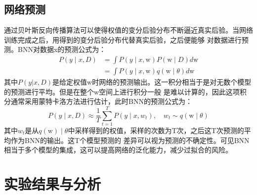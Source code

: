 \subsection{网络预测}
通过贝叶斯反向传播算法可以使得权值的变分后验分布不断逼近真实后验。当网络训练完成之后，用得到的变分后验分布代替真实后验，之后便能够
对数据进行预测。BNN对数据x的预测公式为：
\begin{equation}
	\label{}
	\begin{aligned}
	P(y \mid x, D) & =\int P(y \mid x, \mathrm{w}) P(\mathrm{w} \mid D) d \mathrm{w} \\
	& =\int P(y \mid x, \mathrm{w}) q(\mathrm{w} \mid \theta) d \mathrm{w}
	\end{aligned}
\end{equation}
其中$P(y|x,D)$是给定权值w时网络的预测输出。这一积分相当于是对无数个模型的预测进行平均。但是在整个w空间上进行积分一般
是难以计算的，因此这项积分通常采用蒙特卡洛方法进行估计，此时BNN的预测公式为：
\begin{equation}
	\label{}
	P(y \mid x, D) \approx \frac{1}{T} \sum_{t=1}^T P\left(y \mid x, w_t\right), \quad w_t \sim q(\mathrm{w} \mid \theta)
\end{equation}
其中$w_t$是从$q(\mathrm{w})\mid\theta$中采样得到的权值，采样的次数为T次，之后这T次预测的平均作为BNN的输出。这T个模型预测的
差异可以视为预测的不确定性。可见BNN相当于多个模型的集成，这可以提高网络的泛化能力，减少过拟合的风险。
%

%
\section{实验结果与分析}
